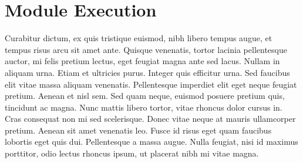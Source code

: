 \section{Module Execution}
Curabitur dictum, ex quis tristique euismod, nibh libero tempus augue, et tempus risus arcu sit amet ante. Quisque venenatis, tortor lacinia pellentesque auctor, mi felis pretium lectus, eget feugiat magna ante sed lacus. Nullam in aliquam urna. Etiam et ultricies purus. Integer quis efficitur urna. Sed faucibus elit vitae massa aliquam venenatis. Pellentesque imperdiet elit eget neque feugiat pretium. Aenean et nisl sem. Sed quam neque, euismod posuere pretium quis, tincidunt ac magna. Nunc mattis libero tortor, vitae rhoncus dolor cursus in. Cras consequat non mi sed scelerisque. Donec vitae neque at mauris ullamcorper pretium. Aenean sit amet venenatis leo. Fusce id risus eget quam faucibus lobortis eget quis dui. Pellentesque a massa augue. Nulla feugiat, nisi id maximus porttitor, odio lectus rhoncus ipsum, ut placerat nibh mi vitae magna.
